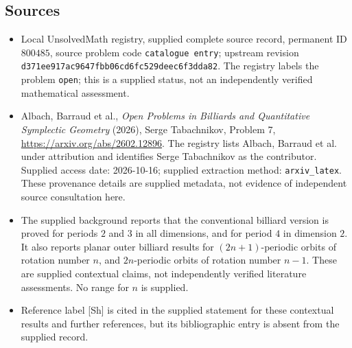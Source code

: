 \documentclass[11pt]{article}
\begin{document}
\subsection{Sources}
\begin{itemize}
\item Local UnsolvedMath registry, supplied complete source record, permanent ID \(800485\), source problem code \texttt{catalogue entry}; upstream revision \texttt{d371ee917ac9647fbb06cd6fc529deec6f3dda82}. The registry labels the problem \texttt{open}; this is a supplied status, not an independently verified mathematical assessment.
\item Albach, Barraud et al., \emph{Open Problems in Billiards and Quantitative Symplectic Geometry} (2026), Serge Tabachnikov, Problem 7, \url{https://arxiv.org/abs/2602.12896}. The registry lists Albach, Barraud et al. under attribution and identifies Serge Tabachnikov as the contributor. Supplied access date: 2026-10-16; supplied extraction method: \texttt{arxiv\_latex}. These provenance details are supplied metadata, not evidence of independent source consultation here.
\item The supplied background reports that the conventional billiard version is proved for periods \(2\) and \(3\) in all dimensions, and for period \(4\) in dimension \(2\). It also reports planar outer billiard results for \((2n+1)\)-periodic orbits of rotation number \(n\), and \(2n\)-periodic orbits of rotation number \(n-1\). These are supplied contextual claims, not independently verified literature assessments. No range for \(n\) is supplied.
\item Reference label [Sh] is cited in the supplied statement for these contextual results and further references, but its bibliographic entry is absent from the supplied record.
\end{itemize}
\end{document}
